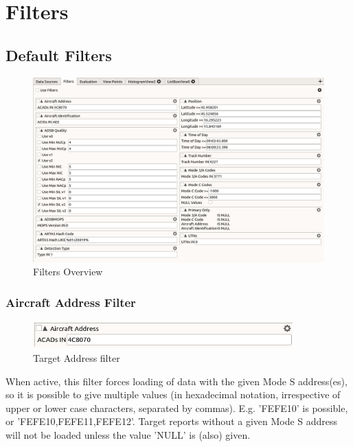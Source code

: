 
\chapter{Filters}
\label{sec:filters} 

\section{Default Filters}
\label{sec:default_filters}

\begin{figure}[H]
    \hspace*{-2.5cm}
    \includegraphics[width=19cm,frame]{figures/ui_filters.png}
  \caption{Filters Overview}
\end{figure}

\subsection{Aircraft Address Filter}

\begin{figure}[H]
  \center
    \includegraphics[width=10cm,frame]{figures/filter_acad.png}
  \caption{Target Address filter}
\end{figure}

When active, this filter forces loading of data with the given Mode S address(es), so it is possible to give multiple values (in hexadecimal notation, irrespective of upper or lower case characters, separated by commas). E.g. 'FEFE10' is possible, or 'FEFE10,FEFE11,FEFE12'. Target reports without a given Mode S address will not be loaded unless the value 'NULL' is (also) given.

